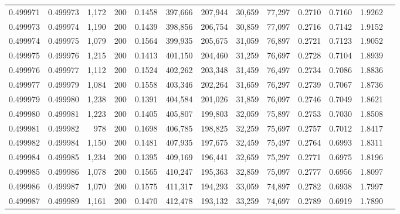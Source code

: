 \begin{tabular}{rrrrrrrrrrrrr}
0.499971 & 0.499973 &  1,172 & 200 &                                     0.1458 & 397,666 & 207,944 &  30,659 &  77,297 & 0.2710 & 0.7160 & 1.9262 \\
0.499973 & 0.499974 &  1,190 & 200 &                                     0.1439 & 398,856 & 206,754 &  30,859 &  77,097 & 0.2716 & 0.7142 & 1.9152 \\
0.499974 & 0.499975 &  1,079 & 200 &                                     0.1564 & 399,935 & 205,675 &  31,059 &  76,897 & 0.2721 & 0.7123 & 1.9052 \\
0.499975 & 0.499976 &  1,215 & 200 &                                     0.1413 & 401,150 & 204,460 &  31,259 &  76,697 & 0.2728 & 0.7104 & 1.8939 \\
0.499976 & 0.499977 &  1,112 & 200 &                                     0.1524 & 402,262 & 203,348 &  31,459 &  76,497 & 0.2734 & 0.7086 & 1.8836 \\
0.499977 & 0.499979 &  1,084 & 200 &                                     0.1558 & 403,346 & 202,264 &  31,659 &  76,297 & 0.2739 & 0.7067 & 1.8736 \\
0.499979 & 0.499980 &  1,238 & 200 &                                     0.1391 & 404,584 & 201,026 &  31,859 &  76,097 & 0.2746 & 0.7049 & 1.8621 \\
0.499980 & 0.499981 &  1,223 & 200 &                                     0.1405 & 405,807 & 199,803 &  32,059 &  75,897 & 0.2753 & 0.7030 & 1.8508 \\
0.499981 & 0.499982 &    978 & 200 &                                     0.1698 & 406,785 & 198,825 &  32,259 &  75,697 & 0.2757 & 0.7012 & 1.8417 \\
0.499982 & 0.499984 &  1,150 & 200 &                                     0.1481 & 407,935 & 197,675 &  32,459 &  75,497 & 0.2764 & 0.6993 & 1.8311 \\
0.499984 & 0.499985 &  1,234 & 200 &                                     0.1395 & 409,169 & 196,441 &  32,659 &  75,297 & 0.2771 & 0.6975 & 1.8196 \\
0.499985 & 0.499986 &  1,078 & 200 &                                     0.1565 & 410,247 & 195,363 &  32,859 &  75,097 & 0.2777 & 0.6956 & 1.8097 \\
0.499986 & 0.499987 &  1,070 & 200 &                                     0.1575 & 411,317 & 194,293 &  33,059 &  74,897 & 0.2782 & 0.6938 & 1.7997 \\
0.499987 & 0.499989 &  1,161 & 200 &                                     0.1470 & 412,478 & 193,132 &  33,259 &  74,697 & 0.2789 & 0.6919 & 1.7890 \\

\end{tabular}
